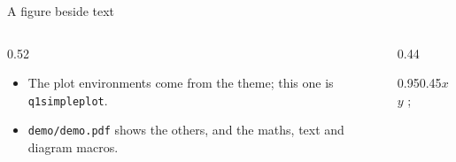 \documentclass[aspectratio=169,10pt]{beamer}
\begin{document}
\begin{frame}{A figure beside text}
  \begin{columns}[c,onlytextwidth]
    \begin{column}{0.52\textwidth}
      \begin{itemize}
        \item The plot environments come from the theme; this one is
              \texttt{q1simpleplot}.
        \item \texttt{demo/demo.pdf} shows the others, and the maths, text
              and diagram macros.
      \end{itemize}
    \end{column}
    \begin{column}{0.44\textwidth}
      \centering
      \begin{q1simpleplot}{0.95\textwidth}{0.45\textheight}{$x$}{$y$}
        ;
      \end{q1simpleplot}
    \end{column}
  \end{columns}
\end{frame}

\closingslide
\end{document}
